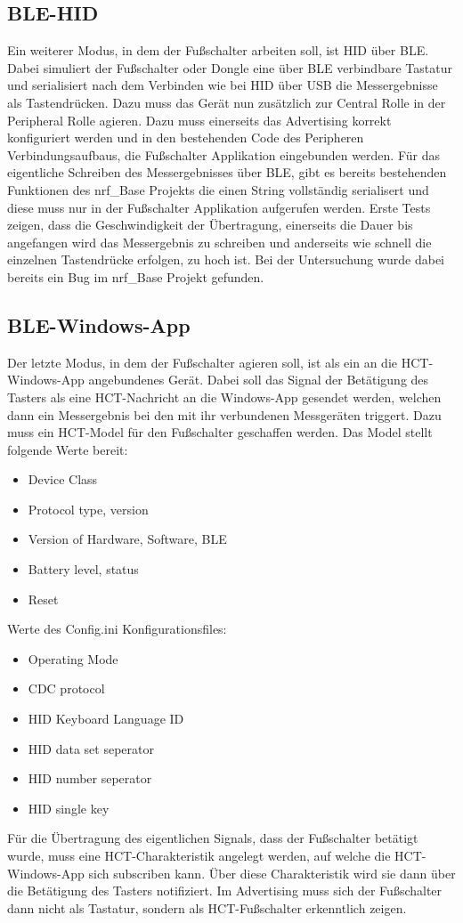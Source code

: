 \subsection{BLE-HID}
Ein weiterer Modus, in dem der Fußschalter arbeiten soll, ist HID über BLE. Dabei simuliert der Fußschalter oder Dongle eine über BLE verbindbare Tastatur und serialisiert nach dem Verbinden wie bei HID über USB die Messergebnisse als Tastendrücken. Dazu muss das Gerät nun zusätzlich zur Central Rolle in der Peripheral Rolle agieren. Dazu muss einerseits das Advertising korrekt konfiguriert werden und in den bestehenden Code des Peripheren Verbindungsaufbaus, die Fußschalter Applikation eingebunden werden. Für das eigentliche Schreiben des Messergebnisses über BLE, gibt es bereits bestehenden Funktionen des nrf\_Base Projekts die einen String vollständig serialisert und diese muss nur in der Fußschalter Applikation aufgerufen werden. Erste Tests zeigen, dass die Geschwindigkeit der Übertragung, einerseits die Dauer bis angefangen wird das Messergebnis zu schreiben und anderseits wie schnell die einzelnen Tastendrücke erfolgen, zu hoch ist. Bei der Untersuchung wurde dabei bereits ein Bug im nrf\_Base Projekt gefunden.  

\subsection{BLE-Windows-App}
Der letzte Modus, in dem der Fußschalter agieren soll, ist als ein an die HCT-Windows-App angebundenes Gerät. Dabei soll das Signal der Betätigung des Tasters als eine HCT-Nachricht an die Windows-App gesendet werden, welchen dann ein Messergebnis bei den mit ihr verbundenen Messgeräten triggert. Dazu muss ein HCT-Model für den Fußschalter geschaffen werden. Das Model stellt folgende Werte bereit:
\begin{itemize}
	\item Device Class
	\item Protocol type, version 
	\item Version of Hardware, Software, BLE
	\item Battery level, status
	\item Reset 
\end{itemize}

Werte des Config.ini Konfigurationsfiles:
\begin{itemize}
	\item Operating Mode 
	\item CDC protocol 
	\item HID Keyboard Language ID 
	\item HID data set seperator 
	\item HID number seperator
	\item HID single key 
\end{itemize}

Für die Übertragung des eigentlichen Signals, dass der Fußschalter betätigt wurde, muss eine HCT-Charakteristik angelegt werden, auf welche die HCT-Windows-App sich subscriben kann. Über diese Charakteristik wird sie dann über die Betätigung des Tasters notifiziert. Im Advertising muss sich der Fußschalter dann nicht als Tastatur, sondern als HCT-Fußschalter erkenntlich zeigen.
